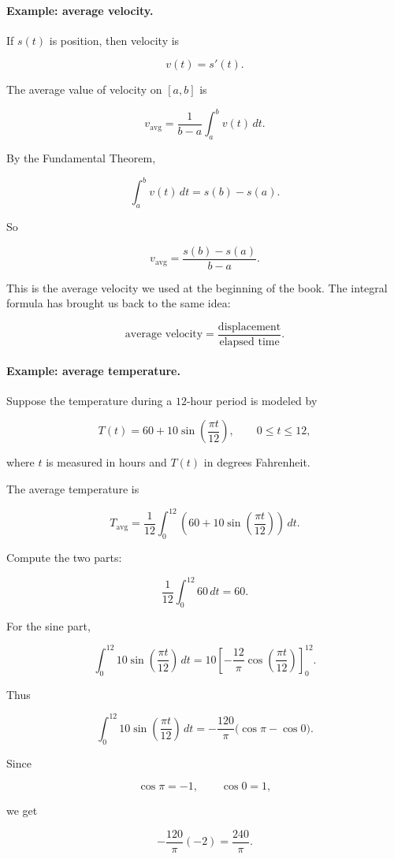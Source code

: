\paragraph{Example: average velocity.}
If \(s(t)\) is position, then velocity is

\[
v(t)=s'(t).
\]

The average value of velocity on \([a,b]\) is

\[
v_{\text{avg}}
=
\frac1{b-a}\int_a^b v(t)\,dt.
\]

By the Fundamental Theorem,

\[
\int_a^b v(t)\,dt=s(b)-s(a).
\]

So

\[
v_{\text{avg}}
=
\frac{s(b)-s(a)}{b-a}.
\]

This is the average velocity we used at the beginning of the book.  The integral formula
has brought us back to the same idea:

\[
\boxed{
\text{average velocity}
=
\frac{\text{displacement}}{\text{elapsed time}}.
}
\]

\paragraph{Example: average temperature.}
Suppose the temperature during a \(12\)-hour period is modeled by

\[
T(t)=60+10\sin\left(\frac{\pi t}{12}\right),
\qquad 0\le t\le12,
\]

where \(t\) is measured in hours and \(T(t)\) in degrees Fahrenheit.

The average temperature is

\[
T_{\text{avg}}
=
\frac1{12}\int_0^{12}
\left(60+10\sin\left(\frac{\pi t}{12}\right)\right)\,dt.
\]

Compute the two parts:

\[
\frac1{12}\int_0^{12}60\,dt=60.
\]

For the sine part,

\[
\int_0^{12}10\sin\left(\frac{\pi t}{12}\right)\,dt
=
10\left[
-\frac{12}{\pi}\cos\left(\frac{\pi t}{12}\right)
\right]_0^{12}.
\]

Thus

\[
\int_0^{12}10\sin\left(\frac{\pi t}{12}\right)\,dt
=
-\frac{120}{\pi}\bigl(\cos\pi-\cos0\bigr).
\]

Since

\[
\cos\pi=-1,
\qquad
\cos0=1,
\]

we get

\[
-\frac{120}{\pi}(-2)=\frac{240}{\pi}.
\]

